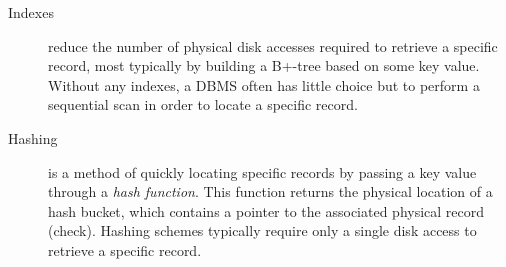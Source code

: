 \documentclass{llncs}
\begin{document}
\begin{description}

	\item[Indexes] reduce the number of physical disk accesses required
	to retrieve a specific record, most typically by building a B+-tree 
	\cite{Knut-DE-1997-Art} based on some key value. Without any
	indexes, a DBMS often has little choice but to perform a sequential
	scan in order to locate a specific record.

% 
% 


	\item[Hashing] is a method of quickly locating specific records by
	passing a key value through a \emph{hash function}. This function
	returns the physical location of a hash bucket, which contains a
	pointer to the associated physical record (check). Hashing schemes
	typically require only a single disk access to retrieve a specific
	record.


\end{description}
\end{document}
